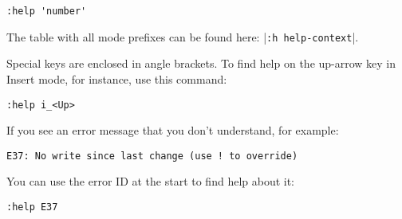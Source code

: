  \begin{Verbatim}[samepage=true]
 :help 'number'
 \end{Verbatim}

The table with all mode prefixes can be found here: |\texttt{:h help-context}|.

Special keys are enclosed in angle brackets.
To find help on the up-arrow key in Insert mode, for instance, use this command: 

 \begin{Verbatim}[samepage=true]
 :help i_<Up>
 \end{Verbatim}

If you see an error message that you don't understand, for example:

	\begin{Verbatim}[samepage=true]
  E37: No write since last change (use ! to override) 
	\end{Verbatim}

You can use the error ID at the start to find help about it:

 \begin{Verbatim}[samepage=true]
 :help E37
 \end{Verbatim}

